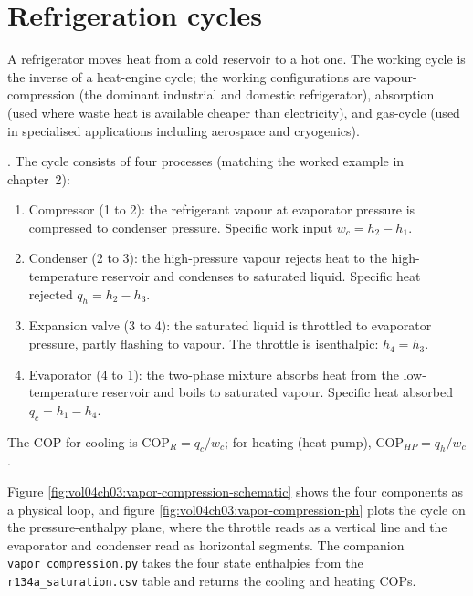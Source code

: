 \section{Refrigeration cycles}

A refrigerator moves heat from a cold reservoir to a hot one. The
working cycle is the inverse of a heat-engine cycle; the working
configurations are vapour-compression (the dominant industrial and
domestic refrigerator), absorption (used where waste heat is
available cheaper than electricity), and gas-cycle (used in
specialised applications including aerospace and cryogenics).

. The cycle consists of four
processes (matching the worked example in chapter~2):

\begin{enumerate}[leftmargin=*]
  \item Compressor (1 to 2): the refrigerant vapour at evaporator
    pressure is compressed to condenser pressure. Specific work
    input $w_c = h_2 - h_1$.
  \item Condenser (2 to 3): the high-pressure vapour rejects heat to
    the high-temperature reservoir and condenses to saturated liquid.
    Specific heat rejected $q_h = h_2 - h_3$.
  \item Expansion valve (3 to 4): the saturated liquid is throttled
    to evaporator pressure, partly flashing to vapour. The throttle
    is isenthalpic: $h_4 = h_3$.
  \item Evaporator (4 to 1): the two-phase mixture absorbs heat from
    the low-temperature reservoir and boils to saturated vapour.
    Specific heat absorbed $q_c = h_1 - h_4$.
\end{enumerate}

The COP for cooling is $\text{COP}_R = q_c/w_c$; for heating (heat
pump), $\text{COP}_{HP} = q_h/w_c$.





Figure \ref{fig:vol04ch03:vapor-compression-schematic} shows the four
components as a physical loop, and figure
\ref{fig:vol04ch03:vapor-compression-ph} plots the cycle on the
pressure-enthalpy plane, where the throttle reads as a vertical line and
the evaporator and condenser read as horizontal segments. The companion
\texttt{vapor\_compression.py} takes the four state enthalpies from the
\texttt{r134a\_saturation.csv} table and returns the cooling and heating
COPs.

